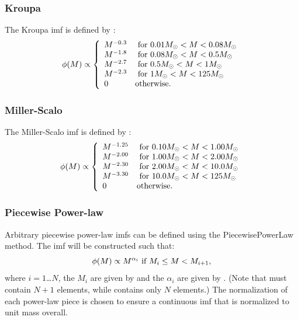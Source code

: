 \subsubsection{Kroupa}

The {\normalfont \ttfamily Kroupa} \gls{imf} is defined by \citep{kroupa_variation_2001}:
\begin{equation}
 \phi(M) \propto \left\{ \begin{array}{ll}
 M^{-0.3} & \hbox{ for } 0.01M_\odot < M < 0.08M_\odot \\ 
 M^{-1.8} & \hbox{ for } 0.08M_\odot < M < 0.5M_\odot \\ 
 M^{-2.7} & \hbox{ for } 0.5M_\odot < M < 1M_\odot \\ 
 M^{-2.3} & \hbox{ for } 1M_\odot < M < 125M_\odot \\ 
0 & \hbox {otherwise.} \end{array} \right.
\end{equation}

\subsubsection{Miller-Scalo}

The {\normalfont \ttfamily Miller-Scalo} \gls{imf} is defined by \citep{miller_initial_1979}:
\begin{equation}
 \phi(M) \propto \left\{ \begin{array}{ll}
 M^{-1.25} & \hbox{ for } 0.10M_\odot < M < 1.00M_\odot \\
 M^{-2.00} & \hbox{ for } 1.00M_\odot < M < 2.00M_\odot \\
 M^{-2.30} & \hbox{ for } 2.00M_\odot < M < 10.0M_\odot \\
 M^{-3.30} & \hbox{ for } 10.0M_\odot < M < 125M_\odot \\
 0 & \hbox {otherwise.} \end{array} \right.
\end{equation}

\subsubsection{Piecewise Power-law}

Arbitrary piecewise power-law {\gls{imf}}s can be defined using the {\normalfont \ttfamily PiecewisePowerLaw} method. The \gls{imf} will be constructed such that:
\begin{equation}
 \phi(M) \propto M^{\alpha_i} \hbox{ if } M_i \le M < M_{i+1},
\end{equation}
where $i=1$\ldots$N$, the $M_i$ are given by {\normalfont \ttfamily [imfPiecewisePowerLawMassPoints]} and the $\alpha_i$ are given by {\normalfont \ttfamily [imfPiecewisePowerLawExponents]}. (Note that {\normalfont \ttfamily [imfPiecewisePowerLawMassPoints]} must contain $N+1$ elements, while {\normalfont \ttfamily [imfPiecewisePowerLawExponents]} contains only $N$ elements.) The normalization of each power-law piece is chosen to ensure a continuous \gls{imf} that is normalized to unit mass overall.

